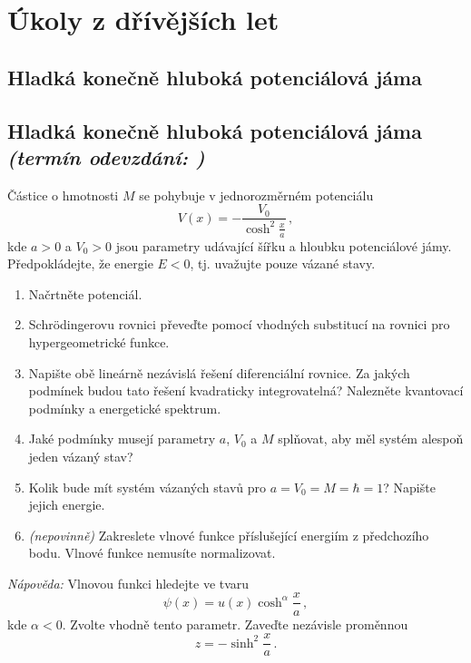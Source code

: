 \documentclass[a4paper,11pt,twoside]{book}
\def\np{\newpage}
\newcommand{\exercise}[2][]{\ifthenelse{\isempty{#1}}
	{\np\section{#2}}
	{\np\section[#2]{{#2} \small{\it{(termín odevzdání: {#1})}}}}
}
\begin{document}
\appendix
\chapter{Úkoly z dřívějších let}
\exercise{Hladká konečně hluboká potenciálová jáma}
    Částice o hmotnosti $M$ se pohybuje v jednorozměrném potenciálu
    \begin{equation*}
        V(x)=-\frac{V_{0}}{\cosh^{2}\frac{x}{a}}\,,
    \end{equation*}
    kde $a>0$ a $V_{0}>0$ jsou parametry udávající šířku a hloubku potenciálové jámy.
    Předpokládejte, že energie $E<0$, tj. uvažujte pouze vázané stavy.

    \begin{enumerate}
    \item
        Načrtněte potenciál.

    \item
        Schrödingerovu rovnici převeďte pomocí vhodných substitucí na rovnici pro 
        hypergeometrické funkce.
        
    \item
        Napište obě lineárně nezávislá řešení diferenciální rovnice.
        Za jakých podmínek budou tato řešení kvadraticky integrovatelná?
        Nalezněte kvantovací podmínky a energetické spektrum.
        
    \item
        Jaké podmínky musejí parametry $a$, $V_{0}$ a $M$ splňovat, 
        aby měl systém alespoň jeden vázaný stav?
        
    \item
        Kolik bude mít systém vázaných stavů pro $a=V_{0}=M=\hbar=1$?
        Napište jejich energie.
        
    \item
        \emph{(nepovinně)} Zakreslete vlnové funkce příslušející energiím z předchozího bodu. 
        Vlnové funkce nemusíte normalizovat.
    \end{enumerate}
    \emph{Nápověda:}
        Vlnovou funkci hledejte ve tvaru
        \begin{equation*}
            \psi(x)=u(x)\cosh^{\alpha}\frac{x}{a}\,,
        \end{equation*}
        kde $\alpha<0$.
        Zvolte vhodně tento parametr.
        Zaveďte nezávisle proměnnou
        \begin{equation*}
            z=-\sinh^{2}\frac{x}{a}\,.
        \end{equation*}	
\end{document}
